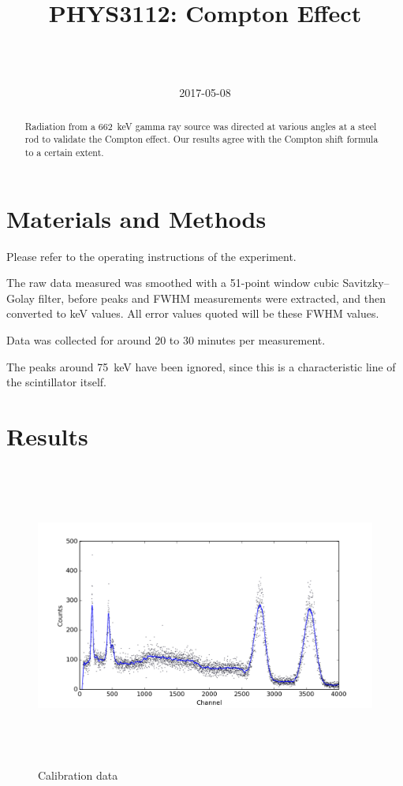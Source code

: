 \documentclass[a4paper]{scrartcl}
\begin{document}
\title{PHYS3112: Compton Effect}
\author{ \\ \\ }
\date{2017-05-08}
\maketitle

\begin{abstract}
    Radiation from a \SI{662}{\kilo\electronvolt} gamma ray source was directed at various angles at a steel rod to validate the Compton effect. Our results agree with the Compton shift formula to a certain extent.
\end{abstract}

\section{Materials and Methods}
Please refer to the operating instructions of the experiment.

The raw data measured was smoothed with a 51-point window cubic Savitzky--Golay filter, before peaks and FWHM measurements were extracted, and then converted to \si{\kilo\electronvolt} values. All error values quoted will be these FWHM values.

Data was collected for around 20 to 30 minutes per measurement.

The peaks around \SI{75}{\kilo\electronvolt} have been ignored, since this is a characteristic line of the scintillator itself.

\section{Results}
\begin{figure}
    \centering
    \includegraphics[height = 10cm]{data/calibration.png}
    \caption{Calibration data}
    \label{fig:calibration}
\end{figure}
\end{document}
